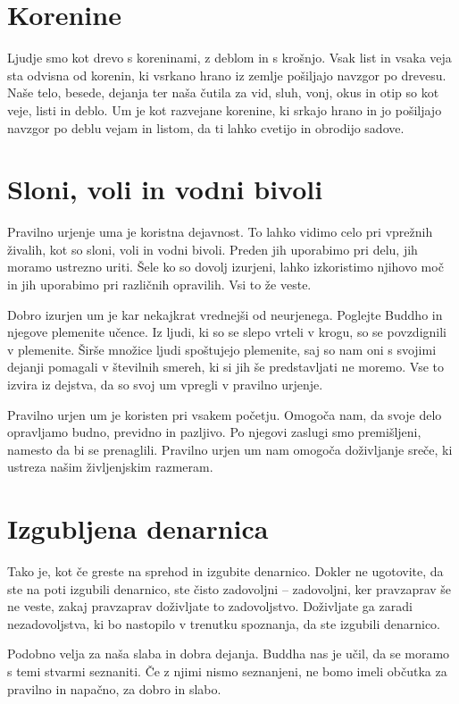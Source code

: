 \section{Korenine}
Ljudje smo kot drevo s koreninami, z deblom in s krošnjo. Vsak list in vsaka veja sta odvisna od korenin, ki vsrkano hrano iz zemlje pošiljajo navzgor po drevesu.
Naše telo, besede, dejanja ter naša čutila za vid, sluh, vonj, okus in otip so kot veje, listi in deblo. Um je kot razvejane korenine, ki srkajo hrano in jo pošiljajo navzgor po deblu vejam in listom, da ti lahko cvetijo in obrodijo sadove.

\section{Sloni, voli in vodni bivoli}
Pravilno urjenje uma je koristna dejavnost. To lahko vidimo celo pri vprežnih živalih, kot so sloni, voli in vodni bivoli. Preden jih uporabimo pri delu, jih moramo ustrezno uriti. Šele ko so dovolj izurjeni, lahko izkoristimo njihovo moč in jih uporabimo pri različnih opravilih. Vsi to že veste.

Dobro izurjen um je kar nekajkrat vrednejši od neurjenega. Poglejte Buddho in njegove plemenite učence. Iz ljudi, ki so se slepo vrteli v krogu, so se povzdignili v plemenite. Širše množice ljudi spoštujejo plemenite, saj so nam oni s svojimi dejanji pomagali v številnih smereh, ki si jih še predstavljati ne moremo. Vse to izvira iz dejstva, da so svoj um vpregli v pravilno urjenje.

Pravilno urjen um je koristen pri vsakem početju. Omogoča nam, da svoje delo opravljamo budno, previdno in pazljivo. Po njegovi zaslugi smo premišljeni, namesto da bi se prenaglili. Pravilno urjen um nam omogoča doživljanje sreče, ki ustreza našim življenjskim razmeram.

\section{Izgubljena denarnica}

Tako je, kot če greste na sprehod in izgubite denarnico. Dokler ne ugotovite, da ste na poti izgubili denarnico, ste čisto zadovoljni – zadovoljni, ker pravzaprav še ne veste, zakaj pravzaprav doživljate to zadovoljstvo. Doživljate ga zaradi nezadovoljstva, ki bo nastopilo v trenutku spoznanja, da ste izgubili denarnico.

Podobno velja za naša slaba in dobra dejanja. Buddha nas je učil, da se moramo s temi stvarmi seznaniti. Če z njimi nismo seznanjeni, ne bomo imeli občutka za pravilno in napačno, za dobro in slabo.


